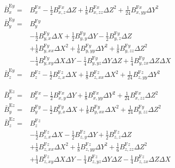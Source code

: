 \documentclass[a4paper,10pt]{article}
\newcommand{\avBey}{\bar{B}^{\mathrm{E}y}}
\newcommand{\avBez}{\bar{B}^{\mathrm{E}z}}
\newcommand{\Bfx}{B^{\mathrm{F}x}}
\newcommand{\Bfy}{B^{\mathrm{F}y}}
\newcommand{\Bfz}{B^{\mathrm{F}z}}
\newcommand{\DX}{\Delta X}
\newcommand{\DY}{\Delta Y}
\newcommand{\DZ}{\Delta Z}
\begin{document}
\begin{align}
\avBey_x = &\Bfx_x -
\frac{1}{2}\Bfx_{x,z}\DZ +
\frac{1}{8}\Bfx_{x,zz}\DZ^2 +
\frac{1}{24}\Bfx_{x,yy}\DY^2
\\
\avBey_y = &\Bfy_y \nonumber
\\ &-
\frac{1}{2}\Bfy_{y,x}\DX +
\frac{1}{2}\Bfy_{y,y}\DY -
\frac{1}{2}\Bfy_{y,z}\DZ \nonumber
\\ &+
\frac{1}{8}\Bfy_{y,xx}\DX^2 +
\frac{1}{6}\Bfy_{y,yy}\DY^2 +
\frac{1}{8}\Bfy_{y,zz}\DZ^2 \nonumber
\\ &-
\frac{1}{4}\Bfy_{y,xy}\DX\DY -
\frac{1}{4}\Bfy_{y,yz}\DY\DZ +
\frac{1}{4}\Bfy_{y,zx}\DZ\DX
\\
\avBey_z = &\Bfz_z -
\frac{1}{2}\Bfz_{z,x}\DX +
\frac{1}{8}\Bfz_{z,xx}\DX^2 +
\frac{1}{24}\Bfz_{z,yy}\DY^2
\end{align}

\begin{align}
\avBez_x = &\Bfx_x -
\frac{1}{2}\Bfx_{x,y}\DY +
\frac{1}{8}\Bfx_{x,yy}\DY^2 +
\frac{1}{24}\Bfx_{x,zz}\DZ^2
\\
\avBez_y = &\Bfy_y -
\frac{1}{2}\Bfy_{y,x}\DX +
\frac{1}{8}\Bfy_{y,xx}\DX^2 +
\frac{1}{24}\Bfy_{y,zz}\DZ^2
\\
\avBez_z = &\Bfz_z \nonumber
\\ &-
\frac{1}{2}\Bfz_{z,x}\DX -
\frac{1}{2}\Bfz_{z,y}\DY +
\frac{1}{2}\Bfz_{z,z}\DZ \nonumber
\\ &+
\frac{1}{8}\Bfz_{z,xx}\DX^2 +
\frac{1}{8}\Bfz_{z,yy}\DY^2 +
\frac{1}{6}\Bfz_{z,zz}\DZ^2 \nonumber
\\ &+
\frac{1}{4}\Bfz_{z,xy}\DX\DY -
\frac{1}{4}\Bfz_{z,yz}\DY\DZ -
\frac{1}{4}\Bfz_{z,zx}\DZ\DX
\end{align}
\end{document}
